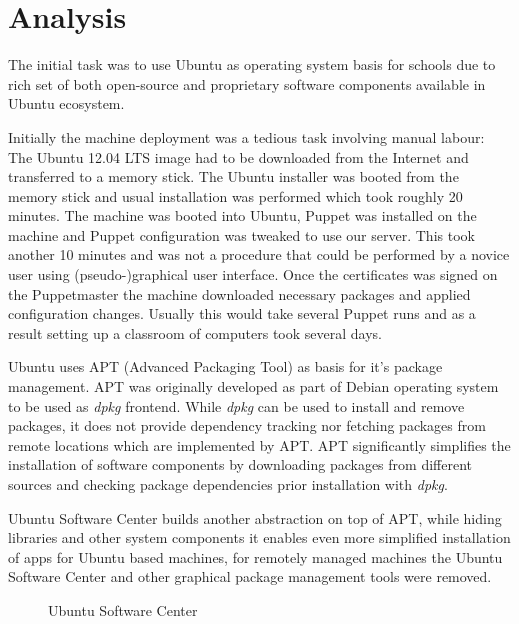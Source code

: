 \documentclass{article}
\begin{document}
\chapter{Analysis}

The initial task was to use Ubuntu as operating system basis
for schools due to rich set of both open-source and
proprietary software components available in Ubuntu ecosystem.

Initially the machine deployment was a tedious task involving
manual labour:
The Ubuntu 12.04 LTS image had to be downloaded from the Internet
and transferred to a memory stick.
The Ubuntu installer was booted from the memory stick
and usual installation was performed which took roughly 20 minutes.
The machine was booted into Ubuntu,
Puppet was installed on the machine and Puppet configuration
was tweaked to use our server.
This took another 10 minutes and was not a procedure that could
be performed by a novice user using (pseudo-)graphical user interface.
Once the certificates was signed on the Puppetmaster the
machine downloaded necessary packages and applied configuration
changes.
Usually this would take several Puppet runs and as a result
setting up a classroom of computers took several days.

Ubuntu uses APT (Advanced Packaging Tool) as basis for
it's package management.
APT was originally developed as part of Debian operating system
to be used as \emph{dpkg} frontend.
While \emph{dpkg} can be used to install and remove packages,
it does not provide dependency tracking nor fetching
packages from remote locations which are implemented by APT.
APT significantly simplifies the installation of software
components by downloading packages from different sources
and checking package dependencies prior installation with \emph{dpkg}.

Ubuntu Software Center builds another abstraction on top of APT,
while hiding libraries and other system components it enables
even more simplified installation of apps for Ubuntu based
machines, for remotely managed machines the Ubuntu Software Center
and other graphical package management tools were removed.

\begin{figure}[!htb]
\centering
{}
\caption{Ubuntu Software Center}
\label{fig:ubuntu-software-center}
\end{figure}
\end{document}

